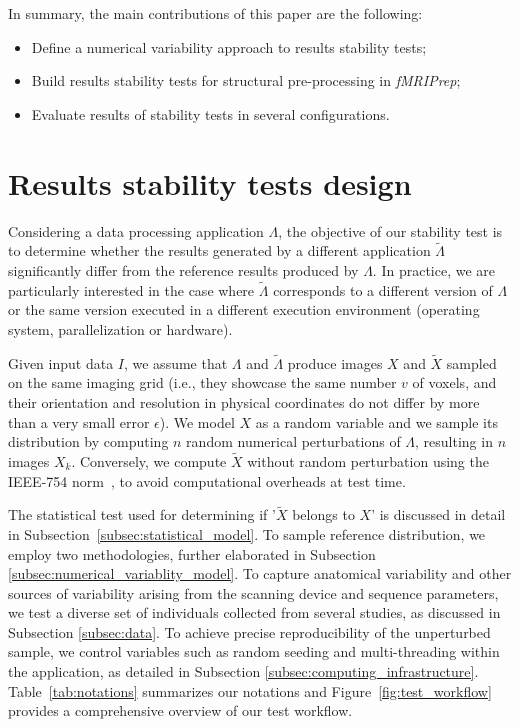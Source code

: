\documentclass[lettersize,journal]{IEEEtran}
\newcommand{\fmriprep}{\emph{fMRIPrep}\xspace}
\begin{document}
In summary, the main contributions of this paper are the following:
\begin{itemize}
  \item Define a numerical variability approach to results stability tests;
  \item Build results stability tests for structural pre-processing in \fmriprep;
  \item Evaluate results of stability tests in several configurations.
\end{itemize}

\section{Results stability tests design}

Considering a data processing application $\Lambda$, the objective of our
stability test is to determine whether the results generated by a different
application $\tilde \Lambda$ significantly differ from the reference results
produced by $\Lambda$. In practice, we are particularly interested in the case
where $\tilde \Lambda$ corresponds to a different version of $\Lambda$ or the
same version executed in a different execution environment (operating system,
parallelization or hardware).

Given input data $I$, we assume that $\Lambda$ and $\tilde \Lambda$ produce
images $X$ and $\tilde X$ sampled on the same imaging grid (i.e., they showcase
the same number $v$ of voxels, and their orientation and resolution in physical
coordinates do not differ by more than a very small error $\epsilon$). We model
$X$ as a random variable and we sample its distribution by computing $n$ random
numerical perturbations of $\Lambda$, resulting in $n$ images $X_k$.
Conversely, we compute $\tilde X$ without random perturbation using the
IEEE-754 norm~\cite{ieee754}, to avoid computational overheads at test time.

The statistical test used for determining if '$\tilde X$ belongs to $X$' is
discussed in detail in Subsection~\ref{subsec:statistical_model}. To sample
reference distribution, we employ two methodologies, further elaborated in
Subsection \ref{subsec:numerical_variablity_model}. To capture anatomical
variability and other sources of variability arising from the scanning device
and sequence parameters, we test a diverse set of individuals collected from
several studies, as discussed in Subsection \ref{subsec:data}. To achieve
precise reproducibility of the unperturbed sample, we control variables such as
random seeding and multi-threading within the application, as detailed in
Subsection \ref{subsec:computing_infrastructure}. Table~\ref{tab:notations}
summarizes our notations and Figure~\ref{fig:test_workflow} provides a
comprehensive overview of our test workflow.
\end{document}
